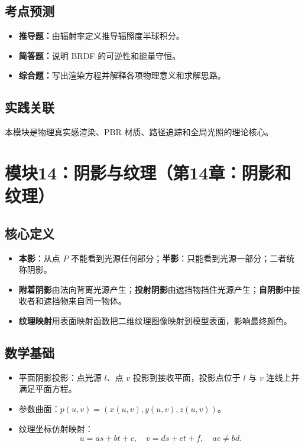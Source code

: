 \documentclass[UTF8,fontset=fandol,11pt]{ctexart}
\newcommand{\key}[1]{\textbf{#1}}
\newcommand{\exam}[1]{\textcolor{blue!55!black}{\textbf{#1}}}
\begin{document}
\subsection{考点预测}
\begin{itemize}
  \item \exam{推导题：}由辐射率定义推导辐照度半球积分。
  \item \exam{简答题：}说明 BRDF 的可逆性和能量守恒。
  \item \exam{综合题：}写出渲染方程并解释各项物理意义和求解思路。
\end{itemize}
\subsection{实践关联}
本模块是物理真实感渲染、PBR 材质、路径追踪和全局光照的理论核心。

\section{模块14：阴影与纹理（第14章：阴影和纹理）}
\subsection{核心定义}
\begin{itemize}
  \item \key{本影}：从点 $P$ 不能看到光源任何部分；\key{半影}：只能看到光源一部分；二者统称阴影。
  \item \key{附着阴影}由法向背离光源产生；\key{投射阴影}由遮挡物挡住光源产生；\key{自阴影}中接收者和遮挡物来自同一物体。
  \item \key{纹理映射}用表面映射函数把二维纹理图像映射到模型表面，影响最终颜色。
\end{itemize}
\subsection{数学基础}
\begin{itemize}
  \item 平面阴影投影：点光源 $l$、点 $v$ 投影到接收平面，投影点位于 $l$ 与 $v$ 连线上并满足平面方程。
  \item 参数曲面：$p(u,v)=(x(u,v),y(u,v),z(u,v))$。
  \item 纹理坐标仿射映射：
  \[
    u=as+bt+c,\quad v=ds+et+f,\quad ae\neq bd.
  \]
\end{itemize}
\end{document}

